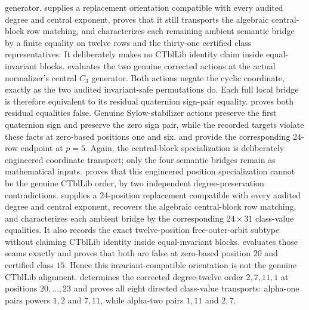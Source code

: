 \documentclass[11pt]{article}
\begin{document}
generator.
supplies a replacement orientation compatible with every audited degree
and central exponent, proves that it still transports the algebraic
central-block row matching, and characterizes each remaining ambient
semantic bridge by a finite equality on twelve rows and the thirty-one
certified class representatives.  It deliberately makes no CTblLib
identity claim inside equal-invariant blocks.
 evaluates the
two genuine corrected actions at the actual normalizer's central
\(C_3\) generator.  Both actions negate the cyclic coordinate, exactly as
the two audited invariant-safe permutations do.  Each full local bridge is
therefore equivalent to its residual quaternion sign-pair equality.
 proves both
residual equalities false.  Genuine Sylow-stabilizer actions preserve the
first quaternion sign and preserve the zero sign pair, while the recorded
targets violate these facts at zero-based positions one and six.
 and
 provide
the corresponding 24-row endpoint at \(p=5\).  Again, the central-block
specialization is deliberately engineered coordinate transport; only the
four semantic bridges remain as mathematical inputs.
proves that this engineered position specialization cannot be the genuine
CTblLib order, by two independent degree-preservation contradictions.
supplies a 24-position replacement compatible with every audited degree and
central exponent, recovers the algebraic central-block row matching, and
characterizes each ambient bridge by the corresponding \(24\times31\)
class-value equalities.  It also records the exact twelve-position
free-outer-orbit subtype without claiming CTblLib identity inside
equal-invariant blocks.
evaluates those seams exactly and proves that both are false at zero-based
position \(20\) and certified class \(15\).  Hence this
invariant-compatible orientation is not the genuine CTblLib alignment.
 determines the
corrected degree-twelve order \(2,7,11,1\) at positions \(20,\ldots,23\)
and proves all eight directed class-value transports: alpha-one pairs
powers \(1,2\) and \(7,11\), while alpha-two pairs \(1,11\) and \(2,7\).
\end{document}
